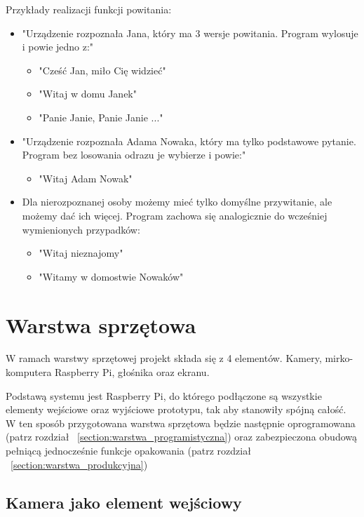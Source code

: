 \documentclass[a4paper,12pt,reqno]{article}
\begin{document}
Przykłady realizacji funkcji powitania:
\begin{itemize}
	\item "Urządzenie rozpoznała Jana, który ma 3 wersje powitania. Program wylosuje i powie jedno z:"
	\begin{itemize}
		\item "Cześć Jan, miło Cię widzieć"
		\item "Witaj w domu Janek"
		\item "Panie Janie, Panie Janie ..." %
	\end{itemize}
	\item "Urządzenie rozpoznała Adama Nowaka, który ma tylko podstawowe pytanie. Program bez losowania odrazu je wybierze i powie:"
	\begin{itemize}
		\item "Witaj Adam Nowak"
	\end{itemize}
	\item Dla nierozpoznanej osoby możemy mieć tylko domyślne przywitanie, ale możemy dać ich więcej. Program zachowa się analogicznie do wcześniej wymienionych przypadków:
	\begin{itemize}
		\item "Witaj nieznajomy"
		\item "Witamy w domostwie Nowaków"
	\end{itemize}
\end{itemize}

\newpage
\section{Warstwa sprzętowa} \label{section:warstwa_sprzetowa}

W ramach warstwy sprzętowej projekt składa się z 4 elementów. Kamery, mirko-komputera Raspberry Pi, głośnika oraz ekranu.

Podstawą systemu jest Raspberry Pi, do którego podłączone są wszystkie elementy wejściowe oraz wyjściowe prototypu, tak aby stanowiły spójną całość. W ten sposób przygotowana warstwa sprzętowa będzie następnie oprogramowana (patrz rozdział ~\ref{section:warstwa_programistyczna}) oraz zabezpieczona obudową pełniącą jednocześnie funkcje opakowania (patrz rozdział ~\ref{section:warstwa_produkcyjna})

\subsection{Kamera jako element wejściowy}
\end{document}
